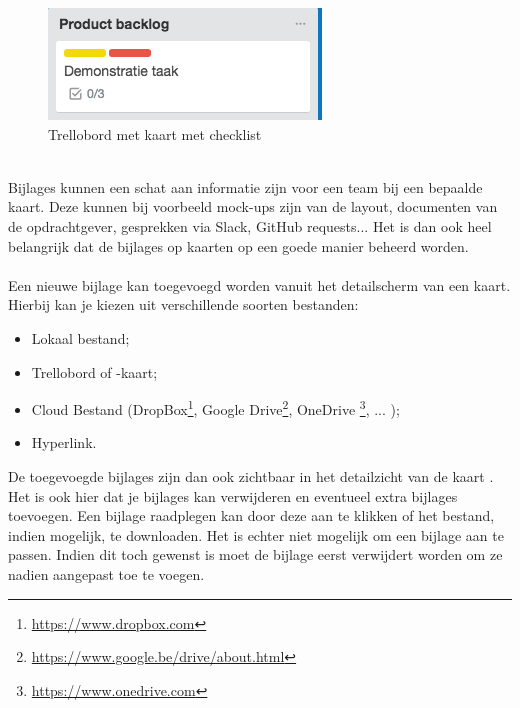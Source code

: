 \begin{figure}[H]
	\centering
	\includegraphics[scale=0.75]{./afbeeldingen/bord_checklist.png}
	\caption{Trellobord met kaart met checklist}
	\label{fig:bord_checklist}	
\end{figure} 

\noindent
\\Bijlages kunnen een schat aan informatie zijn voor een team bij een bepaalde kaart. Deze kunnen bij voorbeeld mock-ups zijn van de layout, documenten van de opdrachtgever, gesprekken via Slack, GitHub requests... Het is dan ook heel belangrijk dat de bijlages op kaarten op een goede manier beheerd worden.
\noindent
\\\\Een nieuwe bijlage kan toegevoegd worden vanuit het detailscherm van een kaart. Hierbij kan je kiezen uit verschillende soorten bestanden:
\begin{itemize}
	\item Lokaal bestand;
	\item Trellobord of -kaart;
	\item Cloud Bestand (DropBox\footnote{\url{https://www.dropbox.com}}, Google Drive\footnote{\url{https://www.google.be/drive/about.html}}, OneDrive \footnote{\url{https://www.onedrive.com}}, ... );
	\item Hyperlink.
\end{itemize}
\noindent
De toegevoegde bijlages zijn dan ook zichtbaar in het detailzicht van de kaart . Het is ook hier dat je bijlages kan verwijderen en eventueel extra bijlages toevoegen. Een bijlage raadplegen kan door deze aan te klikken of het bestand, indien mogelijk, te downloaden. Het is echter niet mogelijk om een bijlage aan te passen. Indien dit toch gewenst is moet de bijlage eerst verwijdert worden om ze nadien aangepast toe te voegen.


